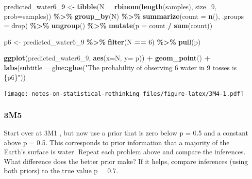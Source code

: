 \documentclass[
]{book}
\newenvironment{Shaded}{\begin{snugshade}}{\end{snugshade}}
\newcommand{\DataTypeTok}[1]{\textcolor[rgb]{0.13,0.29,0.53}{#1}}
\newcommand{\DecValTok}[1]{\textcolor[rgb]{0.00,0.00,0.81}{#1}}
\newcommand{\KeywordTok}[1]{\textcolor[rgb]{0.13,0.29,0.53}{\textbf{#1}}}
\newcommand{\NormalTok}[1]{#1}
\newcommand{\OperatorTok}[1]{\textcolor[rgb]{0.81,0.36,0.00}{\textbf{#1}}}
\newcommand{\StringTok}[1]{\textcolor[rgb]{0.31,0.60,0.02}{#1}}
\begin{document}
\begin{Shaded}
\begin{Highlighting}[]
\NormalTok{predicted\_water6\_}\DecValTok{9}\NormalTok{ \textless{}{-}}\StringTok{ }
\StringTok{  }\KeywordTok{tibble}\NormalTok{(}\DataTypeTok{N =} \KeywordTok{rbinom}\NormalTok{(}\KeywordTok{length}\NormalTok{(samples), }\DataTypeTok{size=}\DecValTok{9}\NormalTok{, }\DataTypeTok{prob=}\NormalTok{samples)) }\OperatorTok{\%\textgreater{}\%}
\StringTok{  }\KeywordTok{group\_by}\NormalTok{(N) }\OperatorTok{\%\textgreater{}\%}
\StringTok{  }\KeywordTok{summarize}\NormalTok{(}\DataTypeTok{count =} \KeywordTok{n}\NormalTok{(), }\DataTypeTok{.groups =} \StringTok{\textquotesingle{}drop\textquotesingle{}}\NormalTok{)  }\OperatorTok{\%\textgreater{}\%}
\StringTok{  }\KeywordTok{ungroup}\NormalTok{() }\OperatorTok{\%\textgreater{}\%}
\StringTok{  }\KeywordTok{mutate}\NormalTok{(}\DataTypeTok{p =}\NormalTok{ count }\OperatorTok{/}\StringTok{ }\KeywordTok{sum}\NormalTok{(count))}
  
\NormalTok{p6 \textless{}{-}}\StringTok{ }
\StringTok{  }\NormalTok{predicted\_water6\_}\DecValTok{9} \OperatorTok{\%\textgreater{}\%}
\StringTok{  }\KeywordTok{filter}\NormalTok{(N }\OperatorTok{==}\StringTok{ }\DecValTok{6}\NormalTok{) }\OperatorTok{\%\textgreater{}\%}
\StringTok{  }\KeywordTok{pull}\NormalTok{(p)}

\KeywordTok{ggplot}\NormalTok{(predicted\_water6\_}\DecValTok{9}\NormalTok{, }\KeywordTok{aes}\NormalTok{(}\DataTypeTok{x=}\NormalTok{N, }\DataTypeTok{y=}\NormalTok{ p)) }\OperatorTok{+}\StringTok{ }
\StringTok{    }\KeywordTok{geom\_point}\NormalTok{() }\OperatorTok{+}\StringTok{ }
\StringTok{  }\KeywordTok{labs}\NormalTok{(}\DataTypeTok{subtitle =}\NormalTok{ glue}\OperatorTok{::}\KeywordTok{glue}\NormalTok{(}\StringTok{"The probability of observing 6 water in 9 tosses is \{p6\}"}\NormalTok{))}
\end{Highlighting}
\end{Shaded}

\texttt{[image: notes-on-statistical-rethinking\_files/figure-latex/3M4-1.pdf]}

\hypertarget{m5-1}{%
\subsubsection*{3M5}\label{m5-1}}

Start over at 3M1 , but now use a prior that is zero below p = 0.5 and a constant above p = 0.5. This corresponds to prior information that a majority of the Earth's surface is water. Repeat each problem above and compare the inferences. What difference does the better prior make? If it helps, compare inferences (using both priors) to the true value p = 0.7.
\end{document}
